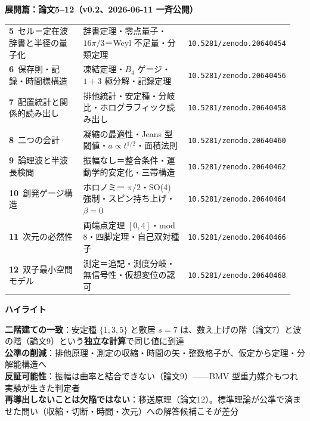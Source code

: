 \documentclass[9pt]{ltjsarticle}
\newcommand{\secrule}[1]{{\large\bfseries\textcolor{acc}{#1}}\par\vspace{1pt}{\color{acc}\rule{\linewidth}{1.2pt}}\par\vspace{3pt}}
\newcommand{\doi}[1]{{\footnotesize\texttt{#1}}}
\begin{document}
\newpage
\begin{minipage}[t]{0.64\textwidth}
\secrule{展開篇：論文5--12（v0.2、2026-06-11 一斉公開）}
{\small
\begin{tabular}{@{}p{0.30\linewidth}p{0.43\linewidth}p{0.22\linewidth}@{}}
\textbf{5}\ セル＝定在波辞書と半径の量子化 & 辞書定理・零点量子・$16\pi/3$＝Weyl 不足量・分類定理 & \doi{10.5281/zenodo.20640454}\\[2pt]
\textbf{6}\ 保存則・記録・時間様構造 & 凍結定理・$B_4$ ゲージ・$1{+}3$ 極分解・記録定理 & \doi{10.5281/zenodo.20640456}\\[2pt]
\textbf{7}\ 配置統計と関係的読み出し & 排他統計・安定種・分岐比・ホログラフィック読み出し & \doi{10.5281/zenodo.20640458}\\[2pt]
\textbf{8}\ 二つの会計 & 凝縮の最適性・Jeans 型閾値・$a\propto t^{1/2}$・面積法則 & \doi{10.5281/zenodo.20640460}\\[2pt]
\textbf{9}\ 論理波と半波長検閲 & 振幅なし＝整合条件・運動学的安定化・三帯構造 & \doi{10.5281/zenodo.20640462}\\[2pt]
\textbf{10}\ 創発ゲージ構造 & ホロノミー $\pi/2$・SO(4) 強制・スピン持ち上げ・$\beta=0$ & \doi{10.5281/zenodo.20640464}\\[2pt]
\textbf{11}\ 次元の必然性 & 両端点定理 $[0,4]$・mod 8・四脚定理・自己双対種子 & \doi{10.5281/zenodo.20640466}\\[2pt]
\textbf{12}\ 双子最小空間モデル & 測定＝追記・測度分岐・無信号性・仮想変位の認可 & \doi{10.5281/zenodo.20640468}\\
\end{tabular}}
\end{minipage}\hfill
\begin{minipage}[t]{0.33\textwidth}
\secrule{ハイライト}
{\small
\textbf{二階建ての一致}：安定種 $\{1,3,5\}$ と敷居 $s=7$ は、数え上げの階（論文7）と波の階（論文9）という\textbf{独立な計算}で同じ値に到達\\[2pt]
\textbf{公準の削減}：排他原理・測定の収縮・時間の矢・整数格子が、仮定から定理・分解能構造へ\\[2pt]
\textbf{反証可能性}：振幅は曲率と結合できない（論文9）——BMV 型重力媒介もつれ実験が生きた判定者\\[2pt]
\textbf{再導出しないことは欠陥ではない}：移送原理（論文12）。標準理論が公準で済ませた問い（収縮・切断・時間・次元）への解答候補こそが差分}
\end{minipage}
\end{document}
